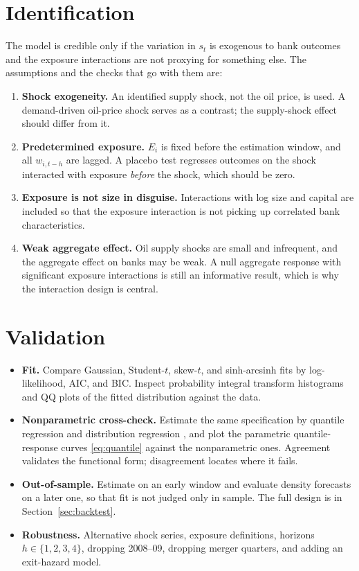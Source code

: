 \documentclass[11pt]{article}
\begin{document}
\section{Identification}

The model is credible only if the variation in $s_t$ is exogenous to bank outcomes and the exposure interactions are not proxying for something else. The assumptions and the checks that go with them are:
\begin{enumerate}
  \item \textbf{Shock exogeneity.} An identified supply shock, not the oil price, is used. A demand-driven oil-price shock serves as a contrast; the supply-shock effect should differ from it.
  \item \textbf{Predetermined exposure.} $E_i$ is fixed before the estimation window, and all $w_{i,t-h}$ are lagged. A placebo test regresses outcomes on the shock interacted with exposure \emph{before} the shock, which should be zero.
  \item \textbf{Exposure is not size in disguise.} Interactions with log size and capital are included so that the exposure interaction is not picking up correlated bank characteristics.
  \item \textbf{Weak aggregate effect.} Oil supply shocks are small and infrequent, and the aggregate effect on banks may be weak. A null aggregate response with significant exposure interactions is still an informative result, which is why the interaction design is central.
\end{enumerate}

\section{Validation}\label{sec:validation}

\begin{itemize}
  \item \textbf{Fit.} Compare Gaussian, Student-$t$, skew-$t$, and sinh-arcsinh fits by log-likelihood, AIC, and BIC. Inspect probability integral transform histograms and QQ plots of the fitted distribution against the data.
  \item \textbf{Nonparametric cross-check.} Estimate the same specification by quantile regression and distribution regression \citep{chernozhukov2013}, and plot the parametric quantile-response curves \eqref{eq:quantile} against the nonparametric ones. Agreement validates the functional form; disagreement locates where it fails.
  \item \textbf{Out-of-sample.} Estimate on an early window and evaluate density forecasts on a later one, so that fit is not judged only in sample. The full design is in Section~\ref{sec:backtest}.
  \item \textbf{Robustness.} Alternative shock series, exposure definitions, horizons $h\in\{1,2,3,4\}$, dropping 2008--09, dropping merger quarters, and adding an exit-hazard model.
\end{itemize}
\end{document}

